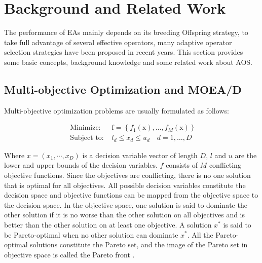 \documentclass[journal]{IEEEtran}
\begin{document}
\IEEEpubidadjcol

\section{Background and Related Work}
The performance of EAs mainly depends on its breeding Offspring strategy, to take full advantage of several effective operators, many adaptive operator selection strategies have been proposed in recent years.
This section provides some basic concepts, background knowledge and some related work about AOS.

\subsection{Multi-objective Optimization and MOEA/D}
Multi-objective optimization problems are usually formulated as follows:

\begin{equation}
  \begin{array}{ll}
    \text { Minimize: }   & \mathrm{f}=\left\{f_{1}(\mathrm{x}), \ldots, f_{M}(\mathrm{x})\right\} \\
    \text { Subject to: } & l_{d} \leq x_{d} \leq u_{d} \quad d=1, \ldots, D
  \end{array}
  \label{eq: moea}
\end{equation}

Where $x = (x_1, \cdots , x_D)$ is a decision variable vector of length $D$, $l$ and $u$ are the lower and upper bounds of the decision variables. $f$ consists of $M$ conflicting objective functions. Since the objectives are conflicting, there is no one solution that is optimal for all objectives.
All possible decision variables constitute the decision space and objective functions can be mapped from the objective space to the decision space\cite{gonccalves2017adaptive}. In the objective space, one solution is said to dominate the other solution if it is no worse than the other solution on all objectives and is better than the other solution on at least one objective.
A solution $x^*$ is said to be Pareto-optimal when no other solution can dominate $x^*$. All the Pareto-optimal solutions constitute the Pareto set, and the image of the Pareto set in objective space is called the Pareto front \cite{deb2001multi}.
\end{document}
